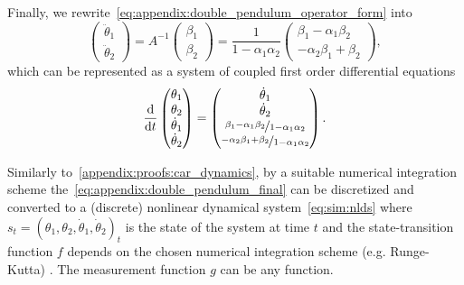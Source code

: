 Finally, we rewrite~\eqref{eq:appendix:double_pendulum_operator_form} into
  \begin{equation}
    \begin{pmatrix}
      \ddot{\theta}_1 \\ \ddot{\theta}_2
    \end{pmatrix}
    = A^{-1}
    \begin{pmatrix}
      \beta_1 \\ \beta_2
    \end{pmatrix}
    = \frac{1}{1 - \alpha_1 \alpha_2}
    \begin{pmatrix}
      \beta_1 -
      \alpha_1\beta_2 \\ -\alpha_2\beta_1 + \beta_2
    \end{pmatrix}
    ,
  \end{equation}
  which can be
  represented as a system of coupled first order differential equations
  \begin{equation}\label{eq:appendix:double_pendulum_final} \frac{\mathrm{d}}{\mathrm{d}t}
  \begin{pmatrix}
    \theta_1 \\ \theta_2 \\ \dot{\theta}_1 \\ \dot{\theta}_2
  \end{pmatrix}
  =
  \begin{pmatrix}
    \dot{\theta}_1     \\ \dot{\theta}_2 \\ \nicefrac{\beta_1 - \alpha_1 \beta_2}{1 -
    \alpha_1 \alpha_2} \\ \nicefrac{-\alpha_2 \beta_1 + \beta_2}{1 - \alpha_1 \alpha_2}
  \end{pmatrix}
  .
\end{equation}

Similarly to~\ref{appendix:proofs:car_dynamics}, by a suitable numerical integration scheme the~\eqref{eq:appendix:double_pendulum_final} can be discretized and converted to a (discrete) nonlinear dynamical system~\eqref{eq:sim:nlds} where $s_t = (\theta_1, \theta_2, \dot{\theta}_1,
    \dot{\theta}_2)_t$ is the state of the system at time $t$ and the state-transition function $f$ depends on the chosen numerical integration scheme (e.g. Runge-Kutta) \citep[Chapter~8]{hasselblatt_handbook_2002}. The measurement function $g$ can be any function. 


